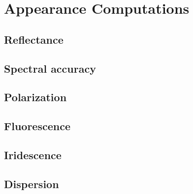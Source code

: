 \chapter{Appearance Computations}
\label{chap:appearance}

\section{Reflectance}

\section{Spectral accuracy}

\section{Polarization}

\section{Fluorescence}

\section{Iridescence}

\section{Dispersion}